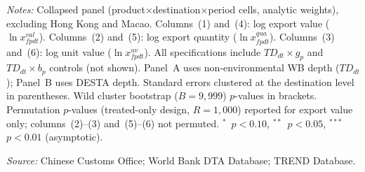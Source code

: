 \begin{table}[htbp]
\begin{threeparttable}
\begin{tablenotes}[flushleft]
\item \textit{Notes:} Collapsed panel (product$\times$destination$\times$period cells, analytic weights), excluding Hong Kong and Macao. Columns~(1) and~(4): log export value ($\ln x^{val}_{fpdt}$). Columns~(2) and~(5): log export quantity ($\ln x^{qua}_{fpdt}$). Columns~(3) and~(6): log unit value ($\ln x^{uv}_{fpdt}$). All specifications include $TD_{dt} \times g_p$ and $TD_{dt} \times b_p$ controls (not shown). Panel~A uses non-environmental WB depth ($TD_{dt}$); Panel~B uses DESTA depth. Standard errors clustered at the destination level in parentheses. Wild cluster bootstrap ($B = 9{,}999$) $p$-values in brackets. Permutation $p$-values (treated-only design, $R = 1{,}000$) reported for export value only; columns~(2)--(3) and~(5)--(6) not permuted. $^{*}$~$p<0.10$, $^{**}$~$p<0.05$, $^{***}$~$p<0.01$ (asymptotic).
\item \textit{Source:} Chinese Customs Office; World Bank DTA Database; TREND Database.
\end{tablenotes}
\end{threeparttable}
\end{table}
